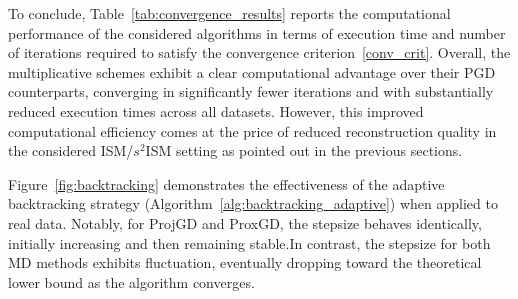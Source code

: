 \documentclass[letterpaper]{article}
\begin{document}
To conclude, Table~\ref{tab:convergence_results} reports the computational performance of the considered algorithms in terms of execution time and number of iterations required to satisfy the convergence criterion~\eqref{conv_crit}. Overall, the multiplicative schemes exhibit a clear computational advantage over their PGD counterparts, converging in significantly fewer iterations and with substantially reduced execution times across all datasets. However, this improved computational efficiency comes at the price of reduced reconstruction quality in the considered ISM/$s^2$ISM setting as pointed out in the previous sections. 

Figure~\ref{fig:backtracking} demonstrates the effectiveness of the adaptive backtracking strategy (Algorithm~\ref{alg:backtracking_adaptive}) when applied to real data. Notably, for ProjGD and ProxGD, the stepsize behaves identically, initially increasing and then remaining stable.In contrast, the stepsize for both MD methods exhibits fluctuation, eventually dropping toward the theoretical lower bound as the algorithm converges.

\end{document}

